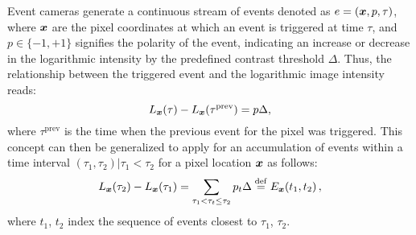 Event cameras generate a continuous stream of events denoted as $ e = (\boldsymbol{x}, p, \tau) $, where $\boldsymbol{x}$ are the pixel coordinates at which an event is triggered at time $\tau$, and $p \in \{-1, +1\}$ signifies the polarity of the event, indicating an increase or decrease in the logarithmic intensity by 
the predefined contrast threshold \( \Delta \). 
Thus, the relationship between the triggered event and the logarithmic image intensity reads: 
\begin{equation}
    L_{\boldsymbol{x}}(\tau) - L_{\boldsymbol{x}}(\tau^\mathrm{prev}) = p\Delta, 
    \label{eq:egm}
\end{equation}
where \( \tau^\mathrm{prev} \) is the time when the previous event for the pixel was triggered. This concept can then be generalized to apply for an accumulation of events within a time interval $(\tau_1, \tau_2) | \tau_1 < \tau_2$ for a pixel location $\boldsymbol{x}$ as follows:
\begin{equation}
    L_{\boldsymbol{x}}(\tau_2) - L_{\boldsymbol{x}}(\tau_1) = \sum_{\tau_1 < \tau_t \leq \tau_2} p_t\Delta \stackrel{\mathrm{def}}{=} E_{\boldsymbol{x}}(t_1, t_2)\mathrm{\,,}
    \label{eq:egm_sum}
\end{equation}
where $t_1$, $t_2$ index the sequence of events closest to 
$\tau_1$, $\tau_2$.



